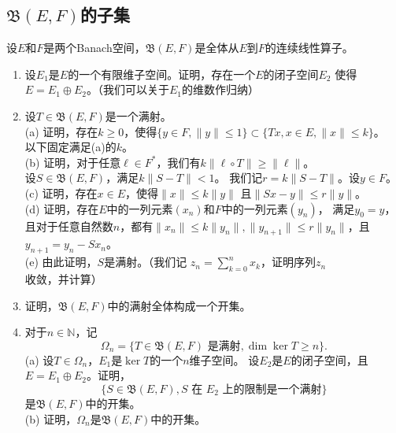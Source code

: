 \subsection*{$\mathfrak{B}(E,F)$的子集}
\qquad 设$E$和$F$是两个Banach空间，$\mathfrak{B}(E,F)$是全体从$E$到$F$的连续线性算子。
\begin{enumerate}
    \item 设$E_1$是$E$的一个有限维子空间。证明，存在一个$E$的闭子空间$E_2$
    使得$E=E_1 \oplus E_2$。（我们可以关于$E_1$的维数作归纳）
    \item 设$T\in\mathfrak{B}(E,F)$是一个满射。\\
    (a) 证明，存在$k\geqslant0$，使得$\{y\in F,\|y\|\leqslant1\}
    \subset\{Tx,x\in E,\|x\|\leqslant k\}$。\\
    以下固定满足(a)的$k$。\\
    (b) 证明，对于任意$\ell\in F^*$，我们有$k\|\ell \circ T\|\geqslant\|\ell\|$。\\
    设$S\in\mathfrak{B}(E,F)$，满足$k\|S-T\|<1$。
    我们记$r=k\|S-T\|$。设$y\in F$。\\
    (c) 证明，存在$x\in E$，使得$\|x\|\leqslant k\|y\|$
    且$\|Sx-y\|\leqslant r\|y\|$。\\
    (d) 证明，存在$E$中的一列元素$(x_n)$和$F$中的一列元素$(y_n)$，
    满足$y_0=y$，且对于任意自然数$n$，都有$\|x_n\|\leqslant k\|y_n\|,
    \|y_{n+1}\|\leqslant r\|y_n\|$，且$y_{n+1}=y_n-Sx_n$。\\
    (e) 由此证明，$S$是满射。（我们记
    $\displaystyle z_n=\sum_{k=0}^nx_k$，证明序列$z_n$收敛，并计算）
    \item 证明，$\mathfrak{B}(E,F)$中的满射全体构成一个开集。
    \item 对于$n\in\mathbb{N}$，记
    \[\Omega_n=\{T\in\mathfrak{B}(E,F)\text{ 是满射},\dim\ker T\geqslant n\}.\]
    (a) 设$T\in\Omega_n$，$E_1$是$\ker T$的一个$n$维子空间。
    设$E_2$是$E$的闭子空间，且$E=E_1 \oplus E_2$。证明，
    \[\{S\in\mathfrak{B}(E,F),S\text{ 在 }E_2\text{ 上的限制是一个满射}\}\]
    是$\mathfrak{B}(E,F)$中的开集。\\
    (b) 证明，$\Omega_n$是$\mathfrak{B}(E,F)$中的开集。
\end{enumerate}
